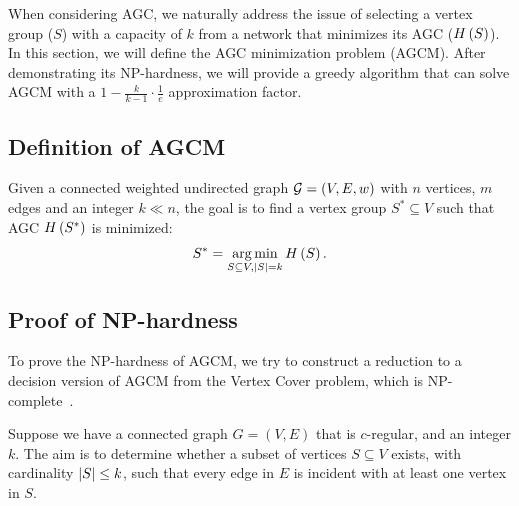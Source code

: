 \documentclass[10pt,twocolumn,twoside]{IEEEtran}
\begin{document}
When considering AGC, we naturally address the issue of selecting a vertex group (\(S\)) with a capacity of \(k\) from a network that minimizes its AGC (\(H\left(S\right)\)).
In this section, we will define the AGC minimization problem (AGCM).
After demonstrating its NP-hardness, we will provide a greedy algorithm that can solve AGCM with a \(1-\frac{k}{k-1}\cdot\frac{1}{e}\) approximation factor.

\subsection{Definition of AGCM}

\begin{problem}
Given a connected weighted undirected graph \(\mathcal{G}=(V,E,w)\) with \(n\) vertices, \(m\) edges and an integer \(k\ll n\), the goal is to find a vertex group \(S^*\subseteq V\) such that AGC \(H\left(S^*\right)\) is minimized:
\begin{equation*}
    S^*=\operatorname*{arg\,min}_{S\subseteq V,\left|S \right|=k}H\left(S\right).
\end{equation*}
\end{problem}

\subsection{Proof of NP-hardness}

To prove the NP-hardness of AGCM, we try to construct a reduction to a decision version of AGCM from the Vertex Cover problem, which is NP-complete~\cite{FrHeJa98}.

\begin{problem}
Suppose we have a connected graph \(G=(V,E)\) that is \(c\)-regular, and an integer \(k\). The aim is to determine whether a subset of vertices \(S\subseteq V\) exists, with cardinality \(\left|S \right|\le k\), such that every edge in \(E\) is incident with at least one vertex in \(S\).
\end{problem}
\end{document}

